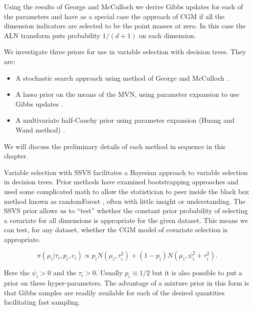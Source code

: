 Using the results of George and McCulloch we derive Gibbs updates for each of the parameters and have as a special case the approach of CGM if all the dimension indicators are selected to be the point masses at zero. In this case the ALN transform puts probability $1/(d+1)$ on each dimension. 


We investigate three priors for use in variable selection with decision trees. They are: 

\begin{itemize}
\item A stochastic search approach using method of George and McCulloch \cite{cui2008empirical,george1993variable}. 
\item A lasso prior on the means of the MVN,  using parameter expansion to use Gibbs updates \cite{park2008bayesian}. 
\item A multivariate half-Cauchy prior using parameter expansion (Huang and Wand method) \cite{huang2013simple,polson2011half,carvalho2010horseshoe,carvalhohandling}. 
\end{itemize}

We will discuss the preliminary details of each method in sequence in this chapter. 

Variable selection with SSVS facilitates a Bayesian approach to variable selection in decision trees. Prior methods have examined bootstrapping approaches and used some complicated math to allow the statistician to peer inside the black box method known as randomForest \cite{ishwaran2010high, ishwaran2007variable}, often with little insight or understanding. The SSVS prior allows us to ``test'' whether the constant prior probability of selecting a covariate for all dimensions is appropriate for the given dataset. This means we can test, for any dataset, whether the CGM model of covariate selection is appropriate.


\begin{equation}
\pi(\mu_i\vert \tau_i, p_i, c_i) \propto p_iN(\mu_i, \tau_i^2)+(1-p_i)N(\mu_i, \psi^2_i+\tau_i^2).
\end{equation}

Here the $\psi_i >0$ and the $\tau_i>0$. Usually $p_i\equiv1/2$ but it is also possible to put a prior on these hyper-parameters. The advantage of a mixture prior in this form is that Gibbs samples are readily available for each of the desired quantities facilitating fast sampling.     

